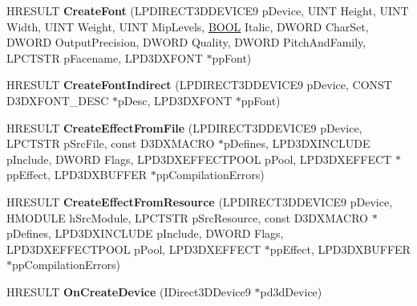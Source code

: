 \begin{DoxyCompactItemize}
\item 
\hypertarget{class_c_d_x_u_t_resource_cache_a55e34fa53a7d702d20a20e6c79acd945}{H\+R\+E\+S\+U\+L\+T {\bfseries Create\+Font} (L\+P\+D\+I\+R\+E\+C\+T3\+D\+D\+E\+V\+I\+C\+E9 p\+Device, U\+I\+N\+T Height, U\+I\+N\+T Width, U\+I\+N\+T Weight, U\+I\+N\+T Mip\+Levels, \hyperlink{_ice_types_8h_a050c65e107f0c828f856a231f4b4e788}{B\+O\+O\+L} Italic, D\+W\+O\+R\+D Char\+Set, D\+W\+O\+R\+D Output\+Precision, D\+W\+O\+R\+D Quality, D\+W\+O\+R\+D Pitch\+And\+Family, L\+P\+C\+T\+S\+T\+R p\+Facename, L\+P\+D3\+D\+X\+F\+O\+N\+T $\ast$pp\+Font)}\label{class_c_d_x_u_t_resource_cache_a55e34fa53a7d702d20a20e6c79acd945}

\item 
\hypertarget{class_c_d_x_u_t_resource_cache_ac3dc49f6b373324035d0833257b1501e}{H\+R\+E\+S\+U\+L\+T {\bfseries Create\+Font\+Indirect} (L\+P\+D\+I\+R\+E\+C\+T3\+D\+D\+E\+V\+I\+C\+E9 p\+Device, C\+O\+N\+S\+T D3\+D\+X\+F\+O\+N\+T\+\_\+\+D\+E\+S\+C $\ast$p\+Desc, L\+P\+D3\+D\+X\+F\+O\+N\+T $\ast$pp\+Font)}\label{class_c_d_x_u_t_resource_cache_ac3dc49f6b373324035d0833257b1501e}

\item 
\hypertarget{class_c_d_x_u_t_resource_cache_a7752a899e2deab9c7b691adc72c45792}{H\+R\+E\+S\+U\+L\+T {\bfseries Create\+Effect\+From\+File} (L\+P\+D\+I\+R\+E\+C\+T3\+D\+D\+E\+V\+I\+C\+E9 p\+Device, L\+P\+C\+T\+S\+T\+R p\+Src\+File, const D3\+D\+X\+M\+A\+C\+R\+O $\ast$p\+Defines, L\+P\+D3\+D\+X\+I\+N\+C\+L\+U\+D\+E p\+Include, D\+W\+O\+R\+D Flags, L\+P\+D3\+D\+X\+E\+F\+F\+E\+C\+T\+P\+O\+O\+L p\+Pool, L\+P\+D3\+D\+X\+E\+F\+F\+E\+C\+T $\ast$pp\+Effect, L\+P\+D3\+D\+X\+B\+U\+F\+F\+E\+R $\ast$pp\+Compilation\+Errors)}\label{class_c_d_x_u_t_resource_cache_a7752a899e2deab9c7b691adc72c45792}

\item 
\hypertarget{class_c_d_x_u_t_resource_cache_a6bc96eb215a1888bdcbffcbb63e45f6d}{H\+R\+E\+S\+U\+L\+T {\bfseries Create\+Effect\+From\+Resource} (L\+P\+D\+I\+R\+E\+C\+T3\+D\+D\+E\+V\+I\+C\+E9 p\+Device, H\+M\+O\+D\+U\+L\+E h\+Src\+Module, L\+P\+C\+T\+S\+T\+R p\+Src\+Resource, const D3\+D\+X\+M\+A\+C\+R\+O $\ast$p\+Defines, L\+P\+D3\+D\+X\+I\+N\+C\+L\+U\+D\+E p\+Include, D\+W\+O\+R\+D Flags, L\+P\+D3\+D\+X\+E\+F\+F\+E\+C\+T\+P\+O\+O\+L p\+Pool, L\+P\+D3\+D\+X\+E\+F\+F\+E\+C\+T $\ast$pp\+Effect, L\+P\+D3\+D\+X\+B\+U\+F\+F\+E\+R $\ast$pp\+Compilation\+Errors)}\label{class_c_d_x_u_t_resource_cache_a6bc96eb215a1888bdcbffcbb63e45f6d}

\item 
\hypertarget{class_c_d_x_u_t_resource_cache_ae502f51b236a110cd2d7470065d284b8}{H\+R\+E\+S\+U\+L\+T {\bfseries On\+Create\+Device} (I\+Direct3\+D\+Device9 $\ast$pd3d\+Device)}\label{class_c_d_x_u_t_resource_cache_ae502f51b236a110cd2d7470065d284b8}


\end{DoxyCompactItemize}
